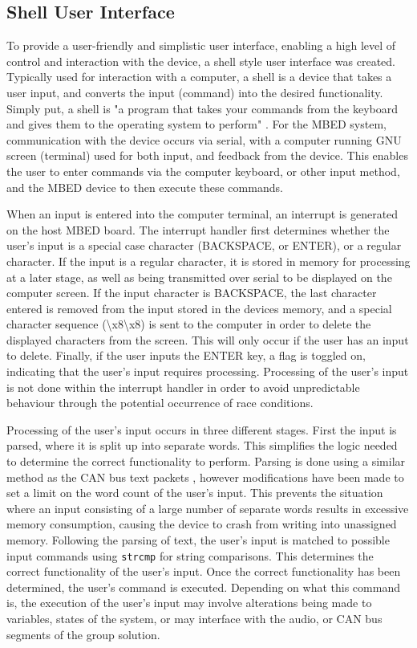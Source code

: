 \subsection*{Shell User Interface}

To provide a user-friendly and simplistic user interface, enabling a high level 
of control and interaction with the device, a shell style user interface was 
created. 
Typically used for interaction with a computer, a shell is a device that takes 
a user input, and converts the input (command) into the desired functionality. 
Simply put, a shell is "a program that takes your commands from the keyboard and 
gives them to the operating system to perform" \cite{shell-def}.
For the MBED system, communication with the device occurs via serial, with a 
computer running GNU screen (terminal) used for both input, and feedback from 
the device. 
This enables the user to enter commands via the computer keyboard, or other input
method, and the MBED device to then execute these commands. 
\par\bigskip\noindent
When an input is entered into the computer terminal, an interrupt is generated
on the host MBED board. 
The interrupt handler first determines whether the user's input is a special case 
character (BACKSPACE, or ENTER), or a regular character. 
If the input is a regular character, it is stored in memory for processing at a 
later stage, as well as being transmitted over serial to be displayed on the 
computer screen. 
If the input character is BACKSPACE, the last character entered is removed from 
the input stored in the devices memory, and a special character sequence (\textbackslash x8\textbackslash x8)
is sent to the computer in order to delete the displayed characters from the 
screen. This will only occur if the user has an input to delete.
Finally, if the user inputs the ENTER key, a flag is toggled on, indicating that 
the user's input requires processing. Processing of the user's input is not done 
within the interrupt handler in order to avoid unpredictable behaviour through 
the potential occurrence of race conditions.  
\par\bigskip\noindent
Processing of the user's input occurs in three different stages. 
First the input is parsed, where it is split up into separate words. This 
simplifies the logic needed to determine the correct functionality to perform.
Parsing is done using a similar method as the CAN bus text packets \cite{text-parser}, 
however modifications have been made to set a limit on the word count of the 
user's input. This prevents the situation where an input consisting of a large 
number of separate words results in excessive memory consumption, causing 
the device to crash from writing into unassigned memory. 
Following the parsing of text, the user's input is matched to possible input 
commands using \texttt{strcmp} for string comparisons. This determines the correct 
functionality of the user's input. 
Once the correct functionality has been determined, the user's command is executed. 
Depending on what this command is, the execution of the user's input may involve 
alterations being made to variables, states of the system, or may interface with 
the audio, or CAN bus segments of the group solution. 

